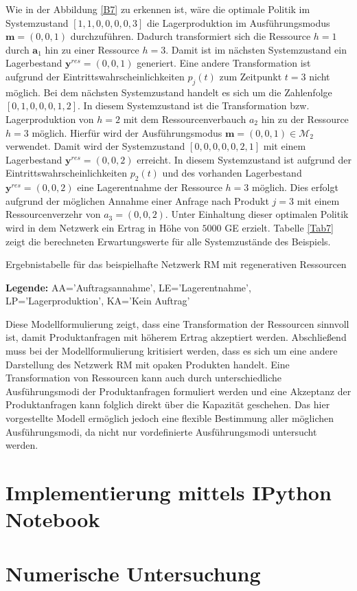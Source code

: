 Wie in der Abbildung \ref{B7} zu erkennen ist, wäre die optimale Politik im Systemzustand $[1,1,0,0,0,0,3]$ die Lagerproduktion im Ausführungsmodus $\textbf{m}=(0,0,1)$ durchzuführen. Dadurch transformiert sich die Ressource $h=1$ durch $\textbf{a}_{1}$ hin zu einer Ressource $h=3$. Damit ist im nächsten Systemzustand ein Lagerbestand $\textbf{y}^{res}=(0,0,1)$ generiert. Eine andere Transformation ist aufgrund der Eintrittswahrscheinlichkeiten $p_{j}(t)$ zum Zeitpunkt $t=3$ nicht möglich. Bei dem nächsten Systemzustand handelt es sich um die Zahlenfolge $[0,1,0,0,0,1,2]$. In diesem Systemzustand ist die Transformation bzw. Lagerproduktion von $h=2$ mit dem Ressourcenverbauch $a_{2}$ hin zu der Ressource $h=3$ möglich. Hierfür wird der Ausführungsmodus $\textbf{m}=(0,0,1)\in\mathcal{M}_2$ verwendet. Damit wird der Systemzustand $[0,0,0,0,0,2,1]$ mit einem Lagerbestand $\textbf{y}^{res}=(0,0,2)$ erreicht. In diesem Systemzustand ist aufgrund der Eintrittswahrscheinlichkeiten $p_2(t)$ und des vorhanden Lagerbestand $\textbf{y}^{res}=(0,0,2)$ eine Lagerentnahme der Ressource $h=3$ möglich. Dies erfolgt aufgrund der möglichen Annahme einer Anfrage nach Produkt $j=3$ mit einem Ressourcenverzehr von $a_{3}=(0,0,2)$. Unter Einhaltung dieser optimalen Politik wird in dem Netzwerk ein Ertrag in Höhe von $5000$ GE erzielt. Tabelle \ref{Tab7} zeigt die berechneten Erwartungswerte für alle Systemzustände des Beispiels. 

\begin{table}
\begin{footnotesize}
    \caption{Ergebnistabelle für das beispielhafte Netzwerk RM mit regenerativen Ressourcen} \label{Tab7}
    \vspace*{3mm}
    \begin{center}
      {\footnotesize \textbf{Legende:} AA='Auftragsannahme', LE='Lagerentnahme', LP='Lagerproduktion', KA='Kein Auftrag'} 
      \end{center}
\end{footnotesize}
\end{table}

Diese Modellformulierung zeigt, dass eine Transformation der Ressourcen sinnvoll ist, damit Produktanfragen mit höherem Ertrag akzeptiert werden. Abschließend muss bei der Modellformulierung kritisiert werden, dass es sich um eine andere Darstellung des Netzwerk RM mit opaken Produkten handelt. Eine Transformation von Ressourcen kann auch durch unterschiedliche Ausführungsmodi der Produktanfragen formuliert werden und eine Akzeptanz der Produktanfragen kann folglich direkt über die Kapazität geschehen. Das hier vorgestellte Modell ermöglich jedoch eine flexible Bestimmung aller möglichen Ausführungsmodi, da nicht nur vordefinierte Ausführungsmodi untersucht werden.


\section{Implementierung mittels IPython Notebook}

\section{Numerische Untersuchung}